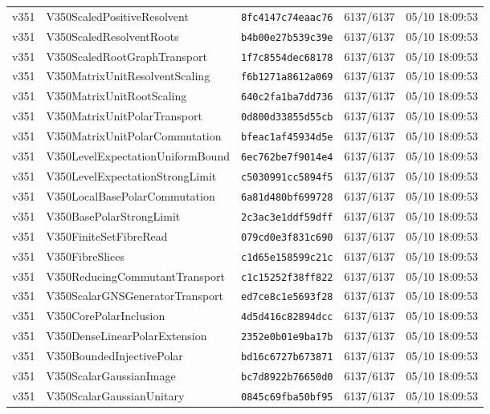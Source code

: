 \documentclass[11pt]{article}
\theoremstyle{definition}\newtheorem{deriv}{Derivation}
\begin{document}
{\begin{longtable}{@{}lllll@{}}
v351 & V350ScaledPositiveResolvent & \texttt{8fc4147c74eaac76} & 6137/6137 & 05/10 18:09:53 \\
v351 & V350ScaledResolventRoots & \texttt{b4b00e27b539c39e} & 6137/6137 & 05/10 18:09:53 \\
v351 & V350ScaledRootGraphTransport & \texttt{1f7c8554dec68178} & 6137/6137 & 05/10 18:09:53 \\
v351 & V350MatrixUnitResolventScaling & \texttt{f6b1271a8612a069} & 6137/6137 & 05/10 18:09:53 \\
v351 & V350MatrixUnitRootScaling & \texttt{640c2fa1ba7dd736} & 6137/6137 & 05/10 18:09:53 \\
v351 & V350MatrixUnitPolarTransport & \texttt{0d800d33855d55cb} & 6137/6137 & 05/10 18:09:53 \\
v351 & V350MatrixUnitPolarCommutation & \texttt{bfeac1af45934d5e} & 6137/6137 & 05/10 18:09:53 \\
v351 & V350LevelExpectationUniformBound & \texttt{6ec762be7f9014e4} & 6137/6137 & 05/10 18:09:53 \\
v351 & V350LevelExpectationStrongLimit & \texttt{c5030991cc5894f5} & 6137/6137 & 05/10 18:09:53 \\
v351 & V350LocalBasePolarCommutation & \texttt{6a81d480bf699728} & 6137/6137 & 05/10 18:09:53 \\
v351 & V350BasePolarStrongLimit & \texttt{2c3ac3e1ddf59dff} & 6137/6137 & 05/10 18:09:53 \\
v351 & V350FiniteSetFibreRead & \texttt{079cd0e3f831c690} & 6137/6137 & 05/10 18:09:53 \\
v351 & V350FibreSlices & \texttt{c1d65e158599c21c} & 6137/6137 & 05/10 18:09:53 \\
v351 & V350ReducingCommutantTransport & \texttt{c1c15252f38ff822} & 6137/6137 & 05/10 18:09:53 \\
v351 & V350ScalarGNSGeneratorTransport & \texttt{ed7ce8c1e5693f28} & 6137/6137 & 05/10 18:09:53 \\
v351 & V350CorePolarInclusion & \texttt{4d5d416c82894dcc} & 6137/6137 & 05/10 18:09:53 \\
v351 & V350DenseLinearPolarExtension & \texttt{2352e0b01e9ba17b} & 6137/6137 & 05/10 18:09:53 \\
v351 & V350BoundedInjectivePolar & \texttt{bd16c6727b673871} & 6137/6137 & 05/10 18:09:53 \\
v351 & V350ScalarGaussianImage & \texttt{bc7d8922b76650d0} & 6137/6137 & 05/10 18:09:53 \\
v351 & V350ScalarGaussianUnitary & \texttt{0845c69fba50bf95} & 6137/6137 & 05/10 18:09:53 \\

\end{longtable}}
\end{document}
